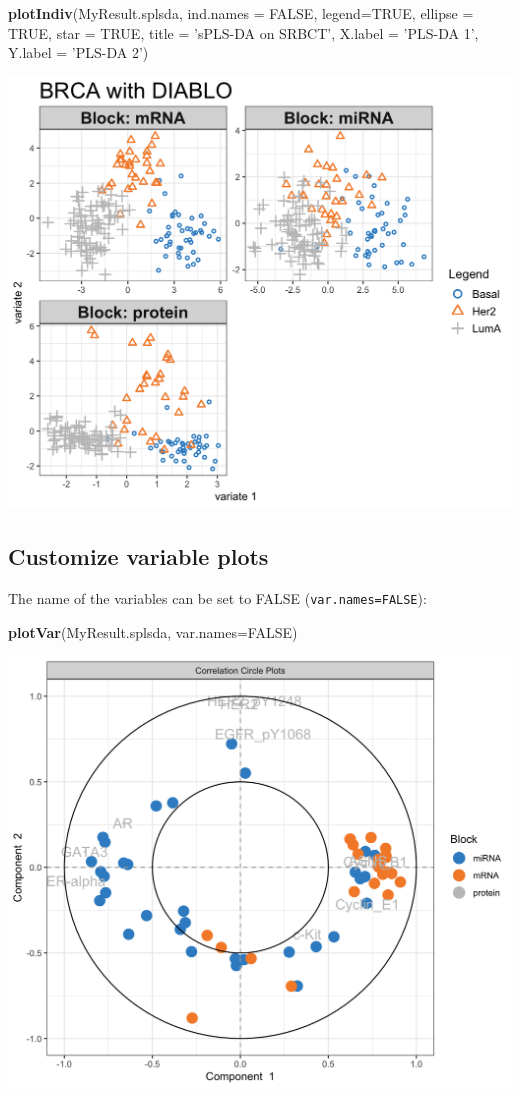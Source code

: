 \documentclass[]{book}
\newenvironment{Shaded}{\begin{snugshade}}{\end{snugshade}}
\newcommand{\KeywordTok}[1]{\textcolor[rgb]{0.13,0.29,0.53}{\textbf{#1}}}
\newcommand{\DataTypeTok}[1]{\textcolor[rgb]{0.13,0.29,0.53}{#1}}
\newcommand{\StringTok}[1]{\textcolor[rgb]{0.31,0.60,0.02}{#1}}
\newcommand{\OtherTok}[1]{\textcolor[rgb]{0.56,0.35,0.01}{#1}}
\newcommand{\NormalTok}[1]{#1}
\theoremstyle{definition}
\theoremstyle{definition}
\theoremstyle{definition}
\theoremstyle{remark}
\begin{document}
\begin{Shaded}
\begin{Highlighting}[]
\KeywordTok{plotIndiv}\NormalTok{(MyResult.splsda, }\DataTypeTok{ind.names =} \OtherTok{FALSE}\NormalTok{, }\DataTypeTok{legend=}\OtherTok{TRUE}\NormalTok{,}
          \DataTypeTok{ellipse =} \OtherTok{TRUE}\NormalTok{, }\DataTypeTok{star =} \OtherTok{TRUE}\NormalTok{, }\DataTypeTok{title =} \StringTok{'sPLS-DA on SRBCT'}\NormalTok{,}
          \DataTypeTok{X.label =} \StringTok{'PLS-DA 1'}\NormalTok{, }\DataTypeTok{Y.label =} \StringTok{'PLS-DA 2'}\NormalTok{)}
\end{Highlighting}
\end{Shaded}

\begin{center}\includegraphics[width=0.5\linewidth]{Figures/unnamed-chunk-4-1} \end{center}

\subsection{Customize variable plots}\label{customize-variable-plots}

The name of the variables can be set to FALSE
(\texttt{var.names=FALSE}):

\begin{Shaded}
\begin{Highlighting}[]
\KeywordTok{plotVar}\NormalTok{(MyResult.splsda, }\DataTypeTok{var.names=}\OtherTok{FALSE}\NormalTok{)}
\end{Highlighting}
\end{Shaded}

\begin{center}\includegraphics[width=0.5\linewidth]{Figures/unnamed-chunk-5-1} \end{center}
\end{document}
